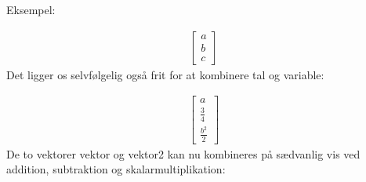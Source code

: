 \documentclass[letterpaper,10pt,english]{jupyterBook}
\begin{document}
Eksempel:

\begin{sphinxVerbatim}[commandchars=\\\{\}]
   
     

  \PYG{p}{[}  \PYG{p}{]}
\end{sphinxVerbatim}
\begin{equation*}
\begin{split}\displaystyle \left[\begin{matrix}a\\b\\c\end{matrix}\right]\end{split}
\end{equation*}
Det ligger os selvfølgelig også frit for at kombinere tal og variable:

\begin{sphinxVerbatim}[commandchars=\\\{\}]
  \PYG{p}{[}       \PYG{p}{]}   
\end{sphinxVerbatim}
\begin{equation*}
\begin{split}\displaystyle \left[\begin{matrix}a\\\frac{3}{4}\\\frac{b^{2}}{2}\end{matrix}\right]\end{split}
\end{equation*}
De to vektorer vektor og vektor2 kan nu kombineres på sædvanlig vis ved addition, subtraktion og skalarmultiplikation:
\end{document}
